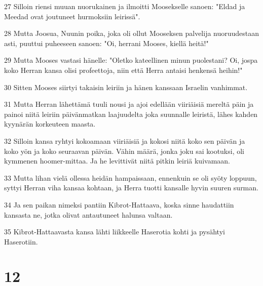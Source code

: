 \par 27 Silloin riensi muuan nuorukainen ja ilmoitti Moosekselle sanoen: "Eldad ja Meedad ovat joutuneet hurmoksiin leirissä".
\par 28 Mutta Joosua, Nuunin poika, joka oli ollut Mooseksen palvelija nuoruudestaan asti, puuttui puheeseen sanoen: "Oi, herrani Mooses, kiellä heitä!"
\par 29 Mutta Mooses vastasi hänelle: "Oletko kateellinen minun puolestani? Oi, jospa koko Herran kansa olisi profeettoja, niin että Herra antaisi henkensä heihin!"
\par 30 Sitten Mooses siirtyi takaisin leiriin ja hänen kanssaan Israelin vanhimmat.
\par 31 Mutta Herran lähettämä tuuli nousi ja ajoi edellään viiriäisiä mereltä päin ja painoi niitä leiriin päivänmatkan laajuudelta joka suunnalle leiristä, lähes kahden kyynärän korkeuteen maasta.
\par 32 Silloin kansa ryhtyi kokoamaan viiriäisiä ja kokosi niitä koko sen päivän ja koko yön ja koko seuraavan päivän. Vähin määrä, jonka joku sai kootuksi, oli kymmenen hoomer-mittaa. Ja he levittivät niitä pitkin leiriä kuivamaan.
\par 33 Mutta lihan vielä ollessa heidän hampaissaan, ennenkuin se oli syöty loppuun, syttyi Herran viha kansaa kohtaan, ja Herra tuotti kansalle hyvin suuren surman.
\par 34 Ja sen paikan nimeksi pantiin Kibrot-Hattaava, koska sinne haudattiin kansasta ne, jotka olivat antautuneet halunsa valtaan.
\par 35 Kibrot-Hattaavasta kansa lähti liikkeelle Haserotia kohti ja pysähtyi Haserotiin.

\chapter{12}

